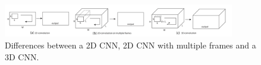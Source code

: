 \begin{figure}[!htb]	\includegraphics[width=0.9\textwidth]{images/3dcnn.png} 
    \centering

\caption{
Differences between a 2D CNN, 2D CNN with multiple frames and a 3D CNN. \cite{Tran2015LearningNetworks}
} 

\label{fig:3dcnn}
\end{figure}